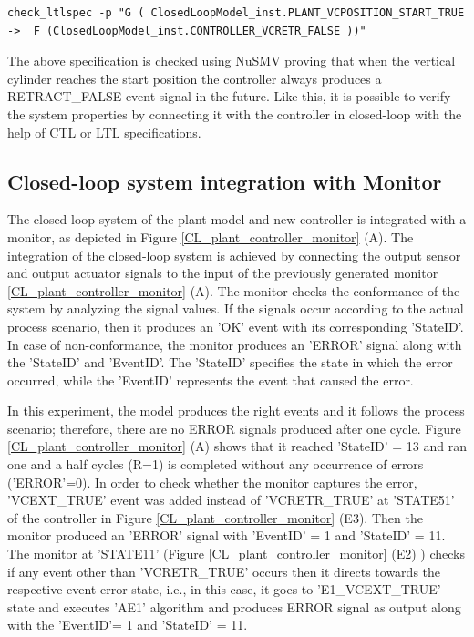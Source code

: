 \documentclass{ieeeojies}
\begin{document}
\begin{lstlisting}[breaklines,basicstyle=\small]
check_ltlspec -p "G ( ClosedLoopModel_inst.PLANT_VCPOSITION_START_TRUE  ->  F (ClosedLoopModel_inst.CONTROLLER_VCRETR_FALSE ))"
\end{lstlisting}

The above specification is checked using NuSMV proving that when  the vertical cylinder reaches the start position the controller always produces a RETRACT\_FALSE event signal in the future. Like this, it is possible to  verify the system properties by connecting it with the controller in closed-loop  with the help of CTL or LTL specifications.


\subsection{Closed-loop system integration with Monitor}

The closed-loop system of the plant model and new controller is integrated with a monitor, as depicted in Figure \ref{CL_plant_controller_monitor} (A). The integration of the closed-loop system is achieved by connecting the output sensor and output actuator signals to the input of the previously generated monitor \ref{CL_plant_controller_monitor}  (A). The monitor checks the conformance of the system by analyzing the signal values. If the signals occur according to the actual process scenario, then it produces an 'OK' event with its corresponding 'StateID'. In case of non-conformance, the monitor produces an 'ERROR' signal along with the 'StateID' and 'EventID'. The 'StateID' specifies the state in which the error occurred, while the 'EventID' represents the event that caused the error.

In this experiment, the model produces the right events and it follows the process scenario; therefore, there are no ERROR signals produced after one cycle. Figure \ref{CL_plant_controller_monitor} (A) shows that it reached 'StateID' = 13 and ran one and a half cycles (R=1) is completed without any occurrence of errors ('ERROR'=0). In order to check whether the monitor captures the error,  'VCEXT\_TRUE' event was added instead of 'VCRETR\_TRUE' at 'STATE51' of the controller in Figure \ref{CL_plant_controller_monitor} (E3). Then the monitor produced an 'ERROR' signal with 'EventID' = 1 and 'StateID' = 11. The monitor at 'STATE11' (Figure \ref{CL_plant_controller_monitor} (E2) ) checks if any event other than 'VCRETR\_TRUE' occurs then it directs towards the respective event error state, i.e., in this case, it goes to 'E1\_VCEXT\_TRUE' state and executes 'AE1' algorithm and produces ERROR signal as output along with the 'EventID'= 1 and 'StateID' = 11.
\end{document}
